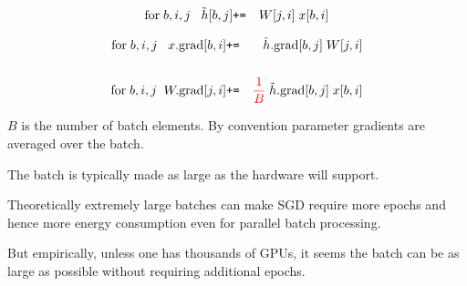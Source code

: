 {
\vspace{-3ex}
\begin{eqnarray*}
  \mathrm{for}\;b,i,j\;\;\;\tilde{h}[b,j] & \mbox{\tt +=} & W[j,i]\;x[b,i]
\end{eqnarray*}

\begin{eqnarray*}
\mathrm{for}\;b,i,j\;\;\;  x.\mathrm{grad}[b,i] & \mbox{\tt +=} & \tilde{h}.\mathrm{grad}[b,j]\;W[j,i] \\
  \\
\mathrm{for}\;b,i,j\;\;  W.\mathrm{grad}[j,i] & \mbox{\tt +=} & {\color{red} \frac{1}{B}}\;\tilde{h}.\mathrm{grad}[b,j]\;x[b,i]
\end{eqnarray*}

\vfill
$B$ is the number of batch elements.  By convention parameter gradients are averaged over the batch.


The batch is typically made as large as the hardware will support.

\vfill
Theoretically extremely large batches can make SGD require more epochs and hence more energy consumption even for parallel batch processing.

\vfill
But empirically, unless one has thousands of GPUs, it seems the batch can be as large as possible without requiring additional epochs.
}


